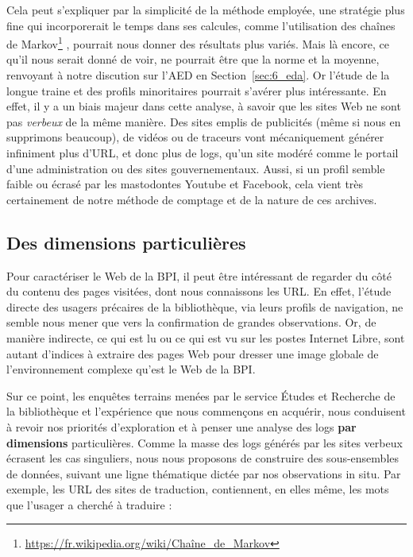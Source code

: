 \documentclass[symmetric,justified,marginals=raggedouter]{tufte-book}
\begin{document}
Cela peut s'expliquer par la simplicité de la méthode employée, une stratégie plus fine qui incorporerait le temps dans ses calcules, comme l'utilisation des chaînes de Markov\footnote{\RaggedOuter \url{https://fr.wikipedia.org/wiki/Chaîne\_de\_Markov}} \citep{cadez_model-based_2003}, pourrait nous donner des résultats plus variés. Mais là encore, ce qu'il nous serait donné de voir, ne pourrait être que la norme et la moyenne, renvoyant à notre discution sur l'AED en Section~\ref{sec:6_eda}. Or l'étude de la longue traine et des profils minoritaires pourrait s'avérer plus intéressante. En effet, il y a un biais majeur dans cette analyse, à savoir que les sites Web ne sont pas \textit{verbeux} de la même manière. Des sites emplis de publicités (même si nous en supprimons beaucoup), de vidéos ou de traceurs vont mécaniquement générer infiniment plus d'URL, et donc plus de logs, qu'un site modéré comme le portail d'une administration ou des sites gouvernementaux. Aussi, si un profil semble faible ou écrasé par les mastodontes Youtube et Facebook, cela vient très certainement de notre méthode de comptage et de la nature de ces archives.

\subsection{Des dimensions particulières}

\noindent Pour caractériser le Web de la BPI, il peut être intéressant de regarder du côté du contenu des pages visitées, dont nous connaissons les URL. En effet, l'étude directe des usagers précaires de la bibliothèque, via leurs profils de navigation, ne semble nous mener que vers la confirmation de grandes observations. Or, de manière indirecte, ce qui est lu ou ce qui est vu sur les postes Internet Libre, sont autant d'indices à extraire des pages Web pour dresser une image globale de l'environnement complexe qu'est le Web de la BPI.

Sur ce point, les enquêtes terrains menées par le service Études et Recherche de la bibliothèque et l'expérience que nous commençons en acquérir, nous conduisent à revoir nos priorités d'exploration et à penser une analyse des logs \textbf{par dimensions} particulières. Comme la masse des logs générés par les sites verbeux écrasent les cas singuliers, nous nous proposons de construire des sous-ensembles de données, suivant une ligne thématique dictée par nos observations in situ. Par exemple, les URL des sites de traduction, contiennent, en elles même, les mots que l'usager a cherché à traduire :
\end{document}
